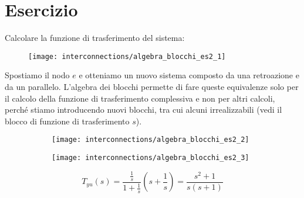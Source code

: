 \documentclass[../main.tex]{subfiles}
\begin{document}
	\section{Esercizio}
	Calcolare la funzione di trasferimento del sistema:\\
	\begin{figure}[h!]
		\centering
		\texttt{[image: interconnections/algebra\_blocchi\_es2\_1]}
	\end{figure}

	Spostiamo il nodo $ e $ e otteniamo un nuovo sistema composto da una retroazione e da un parallelo.
	L'algebra dei blocchi permette di fare queste equivalenze solo per il calcolo della funzione di trasferimento complessiva e non per altri calcoli, perch\'e stiamo introducendo nuovi blocchi, tra cui alcuni irrealizzabili (vedi il blocco di funzione di trasferimento $ s $).
	\begin{figure}[h!]
		\centering
		\begin{subfigure}{0.5\textwidth}
			\texttt{[image: interconnections/algebra\_blocchi\_es2\_2]}
		\end{subfigure}%
		\begin{subfigure}{0.5\textwidth}
			\texttt{[image: interconnections/algebra\_blocchi\_es2\_3]}
		\end{subfigure}%
	\end{figure}
	\[ T_{yu}(s) = \frac{\frac{1}{s}}{1+\frac{1}{s}} \left( s+\frac{1}{s} \right) = \frac{s^2+1}{s(s+1)} \]
\end{document}
